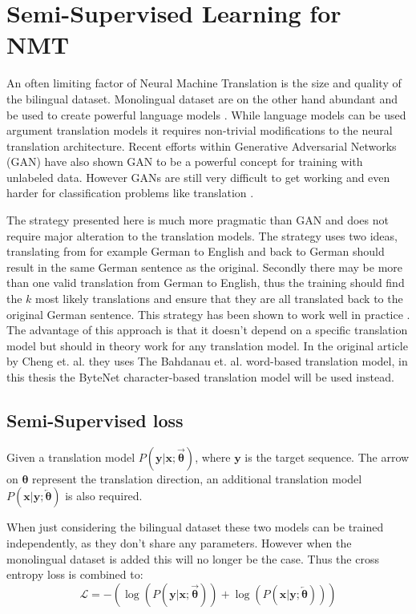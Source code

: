 \section{Semi-Supervised Learning for NMT}
\label{sec:theory:semi-supervised}

An often limiting factor of Neural Machine Translation is the size and quality of the bilingual dataset. Monolingual dataset are on the other hand abundant and be used to create powerful language models \cite{word2vec}. While language models can be used argument translation models it requires non-trivial modifications to the neural translation architecture. Recent efforts within Generative Adversarial Networks (GAN) \cite{gan-image-translation} have also shown GAN to be a powerful concept for training with unlabeled data. However GANs are still very difficult to get working and even harder for classification problems like translation \cite{citation-needed}.

The strategy presented here is much more pragmatic than GAN and does not require major alteration to the translation models. The strategy uses two ideas, translating from for example German to English and back to German should result in the same German sentence as the original. Secondly there may be more than one valid translation from German to English, thus the training should find the $k$ most likely translations and ensure that they are all translated back to the original German sentence. This strategy has been shown to work well in practice \cite{semi-nmt}. The advantage of this approach is that it doesn't depend on a specific translation model but should in theory work for any translation model. In the original article by Cheng et. al. \cite{semi-nmt} they uses The Bahdanau et. al. \cite{bahdanau-2015-nmt} word-based translation model, in this thesis the ByteNet \cite{bytenet} character-based translation model will be used instead.

\subsection{Semi-Supervised loss}

Given a translation model $P(\mathbf{y}|\mathbf{x};\overrightarrow{\boldsymbol\theta})$, where $\mathbf{y}$ is the target sequence. The arrow on ${\boldsymbol\theta}$ represent the translation direction, an additional translation model $P(\mathbf{x}|\mathbf{y};\overleftarrow{\boldsymbol\theta})$ is also required.

When just considering the bilingual dataset these two models can be trained independently, as they don't share any parameters. However when the monolingual dataset is added this will no longer be the case. Thus the cross entropy loss is combined to:
\begin{equation}
\mathcal{L} = -\left(
    \log(P(\mathbf{y}|\mathbf{x};\overrightarrow{\boldsymbol\theta})) +
    \log(P(\mathbf{x}|\mathbf{y};\overleftarrow{\boldsymbol\theta}))
\right)
\label{eq:theory:semi-bytenet:bilingural}
\end{equation}

